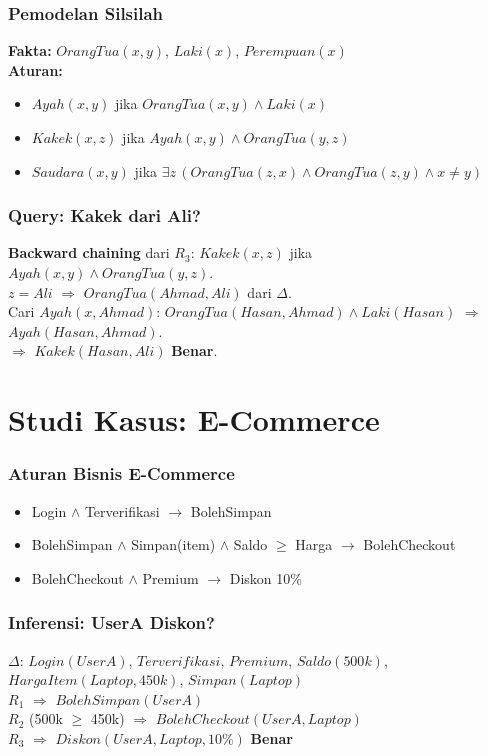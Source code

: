 \documentclass[handout]{beamer}
\theoremstyle{definition}
\theoremstyle{example}
\begin{document}
\begin{frame}
\frametitle{Pemodelan Silsilah}
\textbf{Fakta:} $OrangTua(x,y)$, $Laki(x)$, $Perempuan(x)$\\
\textbf{Aturan:}
\begin{itemize}
  \item $Ayah(x,y)$ jika $OrangTua(x,y) \wedge Laki(x)$
  \item $Kakek(x,z)$ jika $Ayah(x,y) \wedge OrangTua(y,z)$
  \item $Saudara(x,y)$ jika $\exists z\, (OrangTua(z,x) \wedge OrangTua(z,y) \wedge x \neq y)$
\end{itemize}
\end{frame}

\begin{frame}
\frametitle{Query: Kakek dari Ali?}
\textbf{Backward chaining} dari $R_3$: $Kakek(x,z)$ jika $Ayah(x,y) \wedge OrangTua(y,z)$.\\
$z=Ali$ $\Rightarrow$ $OrangTua(Ahmad, Ali)$ dari $\Delta$.\\
Cari $Ayah(x, Ahmad)$: $OrangTua(Hasan, Ahmad) \wedge Laki(Hasan)$ $\Rightarrow$ $Ayah(Hasan, Ahmad)$.\\
$\Rightarrow$ $Kakek(Hasan, Ali)$ \textbf{Benar}.
\end{frame}

\section{Studi Kasus: E-Commerce}

\begin{frame}
\frametitle{Aturan Bisnis E-Commerce}
\begin{itemize}
  \item Login $\wedge$ Terverifikasi $\rightarrow$ BolehSimpan
  \item BolehSimpan $\wedge$ Simpan(item) $\wedge$ Saldo $\geq$ Harga $\rightarrow$ BolehCheckout
  \item BolehCheckout $\wedge$ Premium $\rightarrow$ Diskon 10\%
\end{itemize}
\end{frame}

\begin{frame}
\frametitle{Inferensi: UserA Diskon?}
$\Delta$: $Login(UserA)$, $Terverifikasi$, $Premium$, $Saldo(500k)$, $HargaItem(Laptop, 450k)$, $Simpan(Laptop)$\\
$R_1$ $\Rightarrow$ $BolehSimpan(UserA)$\\
$R_2$ (500k $\geq$ 450k) $\Rightarrow$ $BolehCheckout(UserA, Laptop)$\\
$R_3$ $\Rightarrow$ $Diskon(UserA, Laptop, 10\%)$ \textbf{Benar}
\end{frame}
\end{document}
